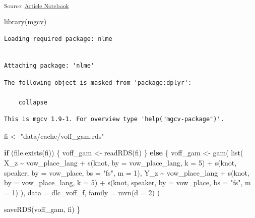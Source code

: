 \documentclass[
]{interact}
\newenvironment{Shaded}{\begin{snugshade}}{\end{snugshade}}
\newcommand{\AttributeTok}[1]{\textcolor[rgb]{0.40,0.45,0.13}{#1}}
\newcommand{\ControlFlowTok}[1]{\textcolor[rgb]{0.00,0.23,0.31}{\textbf{#1}}}
\newcommand{\DecValTok}[1]{\textcolor[rgb]{0.68,0.00,0.00}{#1}}
\newcommand{\FunctionTok}[1]{\textcolor[rgb]{0.28,0.35,0.67}{#1}}
\newcommand{\NormalTok}[1]{\textcolor[rgb]{0.00,0.23,0.31}{#1}}
\newcommand{\OtherTok}[1]{\textcolor[rgb]{0.00,0.23,0.31}{#1}}
\newcommand{\SpecialCharTok}[1]{\textcolor[rgb]{0.37,0.37,0.37}{#1}}
\newcommand{\StringTok}[1]{\textcolor[rgb]{0.13,0.47,0.30}{#1}}
\begin{document}
\textsubscript{Source:
\href{https://stefanocoretta.github.io/mv_uti/index.qmd.html}{Article
Notebook}}

\begin{Shaded}
\begin{Highlighting}[]
\FunctionTok{library}\NormalTok{(mgcv)}
\end{Highlighting}
\end{Shaded}

\begin{verbatim}
Loading required package: nlme
\end{verbatim}

\begin{verbatim}

Attaching package: 'nlme'
\end{verbatim}

\begin{verbatim}
The following object is masked from 'package:dplyr':

    collapse
\end{verbatim}

\begin{verbatim}
This is mgcv 1.9-1. For overview type 'help("mgcv-package")'.
\end{verbatim}

\begin{Shaded}
\begin{Highlighting}[]
\NormalTok{fi }\OtherTok{\textless{}{-}} \StringTok{"data/cache/voff\_gam.rds"}

\ControlFlowTok{if}\NormalTok{ (}\FunctionTok{file.exists}\NormalTok{(fi)) \{}
\NormalTok{  voff\_gam }\OtherTok{\textless{}{-}} \FunctionTok{readRDS}\NormalTok{(fi)}
\NormalTok{\} }\ControlFlowTok{else}\NormalTok{ \{}
\NormalTok{  voff\_gam }\OtherTok{\textless{}{-}} \FunctionTok{gam}\NormalTok{(}
    \FunctionTok{list}\NormalTok{(}
\NormalTok{      X\_z }\SpecialCharTok{\textasciitilde{}}\NormalTok{ vow\_place\_lang }\SpecialCharTok{+}
        \FunctionTok{s}\NormalTok{(knot, }\AttributeTok{by =}\NormalTok{ vow\_place\_lang, }\AttributeTok{k =} \DecValTok{5}\NormalTok{) }\SpecialCharTok{+}
        \FunctionTok{s}\NormalTok{(knot, speaker, }\AttributeTok{by =}\NormalTok{ vow\_place, }\AttributeTok{bs =} \StringTok{"fs"}\NormalTok{, }\AttributeTok{m =} \DecValTok{1}\NormalTok{),}
\NormalTok{      Y\_z }\SpecialCharTok{\textasciitilde{}}\NormalTok{ vow\_place\_lang }\SpecialCharTok{+}
        \FunctionTok{s}\NormalTok{(knot, }\AttributeTok{by =}\NormalTok{ vow\_place\_lang, }\AttributeTok{k =} \DecValTok{5}\NormalTok{) }\SpecialCharTok{+}
        \FunctionTok{s}\NormalTok{(knot, speaker, }\AttributeTok{by =}\NormalTok{ vow\_place, }\AttributeTok{bs =} \StringTok{"fs"}\NormalTok{, }\AttributeTok{m =} \DecValTok{1}\NormalTok{)}
\NormalTok{    ),}
    \AttributeTok{data =}\NormalTok{ dlc\_voff\_f,}
    \AttributeTok{family =} \FunctionTok{mvn}\NormalTok{(}\AttributeTok{d =} \DecValTok{2}\NormalTok{)}
\NormalTok{  )}
  
  \FunctionTok{saveRDS}\NormalTok{(voff\_gam, fi)}
\NormalTok{\}}
\end{Highlighting}
\end{Shaded}
\end{document}
